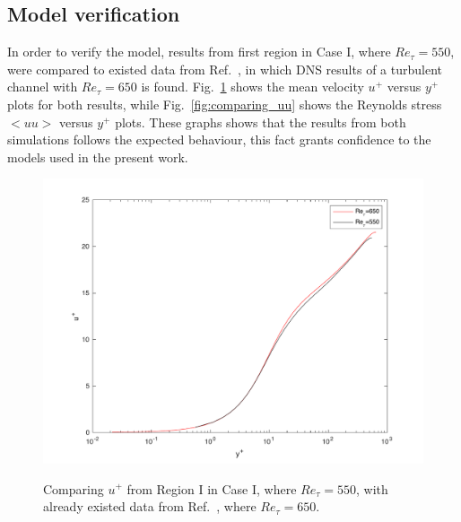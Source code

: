 \documentclass[twocolumn,10pt]{asme2e}
\begin{document}
\subsection*{Model verification}

In order to verify the model, results from first region in Case I, where \(Re_{\tau}=550\), were compared to existed data from Ref.~\cite{iwamoto2002}, in which DNS results of a turbulent channel with \(Re_{\tau}=650\) is found. Fig.~\ref{fig:comparing_u} shows the mean velocity \(u^+\) versus \(y^+\) plots for both results, while Fig.~\ref{fig:comparing_uu} shows the Reynolds stress \(<uu>\) versus \(y^+\) plots. These graphs shows that the results from both simulations follows the expected behaviour, this fact grants confidence to the models used in the present work.

\begin{figure}[t]
\centering
\scalebox{0.5}
{\includegraphics{comparing_u.pdf}}
\caption{Comparing \(u^+\) from Region I in Case I, where \(Re_{\tau}=550\), with already existed data from Ref.~\cite{iwamoto2002}, where \(Re_{\tau}=650\).}
\label{fig:comparing_u}
\end{figure}
\end{document}
